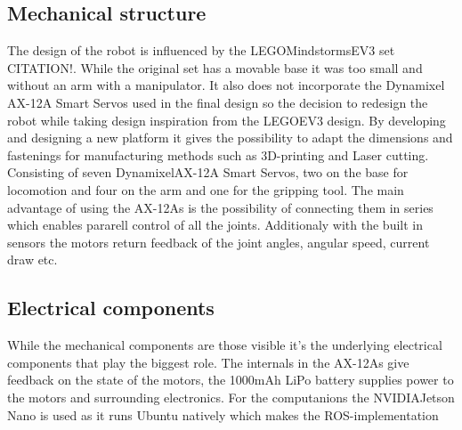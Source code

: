 
\subsection{Mechanical structure}
The design of the robot is influenced by the LEGO\textregistered Mindstorms\textregistered EV3 set CITATION!. While the original set has a movable base it was too small and without an arm with a manipulator. It also does not incorporate the Dynamixel AX-12A Smart Servos used in the final design so the decision to redesign the robot while taking design inspiration from the LEGO\textregistered EV3 design. By developing and designing a new platform it gives the possibility to adapt the dimensions and fastenings for manufacturing methods such as 3D-printing and Laser cutting. 
Consisting of seven Dynamixel\textregistered AX-12A Smart Servos, two on the base for locomotion and four on the arm and one for the gripping tool. The main advantage of using the AX-12As is the possibility of connecting them in series which enables pararell control of all the joints. Additionaly with the built in sensors the motors return feedback of the joint angles, angular speed, current draw etc. 
\subsection{Electrical components}
While the mechanical components are those visible it's the underlying electrical components that play the biggest role. The internals in the AX-12As give feedback on the state of the motors, the 1000mAh LiPo battery supplies power to the motors and surrounding electronics. For the computanions the NVIDIA\textregistered Jetson Nano is used as it runs Ubuntu natively which makes the ROS-implementation 


